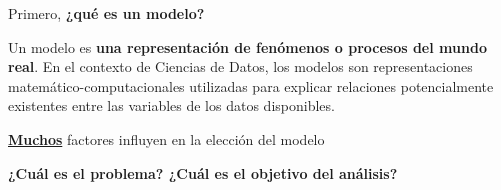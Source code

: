 \documentclass[aspectratio=169, usenames,dvipsnames]{beamer}
\begin{document}
\begin{frame}
    Primero, \textbf{¿qué es un modelo?}
    \vspace{1cm}

    Un modelo es \textbf{una representación de fenómenos o procesos del mundo real}. En el contexto de Ciencias de Datos, los modelos son representaciones matemático-computacionales utilizadas para explicar relaciones potencialmente existentes entre las variables de los datos disponibles.

    \vspace{1em}
    \pause
    \Large{\color{red}\underline{\textbf{Muchos}} factores influyen en la elección del modelo}
\end{frame}

\begin{frame}
    \vspace{-2cm}
    \centering
    \Large \textbf{¿Cuál es el problema? ¿Cuál es el objetivo del análisis?}
        \vfill


        \pause


\end{frame}
\end{document}
